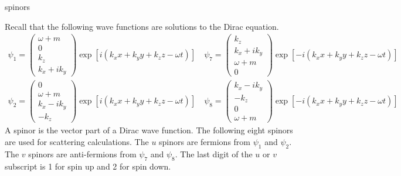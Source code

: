 \documentclass[12pt]{article}
\begin{document}
\begin{center}
{\sc spinors}
\end{center}

\noindent
Recall that the following wave functions are solutions to the Dirac equation.
\begin{gather*}
\psi_1=\begin{pmatrix}\omega+m\\0\\k_z\\k_x+ik_y\end{pmatrix}
\exp[i(k_xx+k_yy+k_zz-\omega t)]
\quad
\psi_7=\begin{pmatrix}k_z\\k_x+ik_y\\ \omega+m\\0\end{pmatrix}
\exp[-i(k_xx+k_yy+k_zz-\omega t)]
\\
\psi_2=\begin{pmatrix}0\\ \omega+m\\k_x-ik_y\\-k_z\end{pmatrix}
\exp[i(k_xx+k_yy+k_zz-\omega t)]
\quad
\psi_8=\begin{pmatrix}k_x-ik_y\\-k_z\\0\\ \omega+m\end{pmatrix}
\exp[-i(k_xx+k_yy+k_zz-\omega t)]
\end{gather*}
%
A spinor is the vector part of a Dirac wave function.
The following eight spinors are used for scattering calculations.
The $u$ spinors are fermions from $\psi_1$ and $\psi_2$.
The $v$ spinors are anti-fermions from $\psi_7$ and $\psi_8$.
The last digit of the $u$ or $v$ subscript is 1 for spin up and 2 for spin down.
\end{document}
